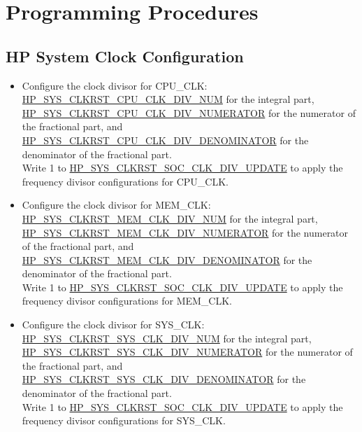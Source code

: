 \documentclass[main\_\_EN.tex]{subfiles}
\begin{document}
\section{Programming Procedures}
\label{sec:resclk-prog-procedures}

\subsection{HP System Clock Configuration}

\begin{itemize}
    \item Configure the clock divisor for CPU\_CLK: \hyperref[fielddesc:HPSYSCLKRSTCPUCLKDIVNUM]{HP\_SYS\_CLKRST\_CPU\_CLK\_DIV\_NUM} for the integral part, \hyperref[fielddesc:HPSYSCLKRSTCPUCLKDIVNUMERATOR]{HP\_SYS\_CLKRST\_CPU\_CLK\_DIV\_NUMERATOR} for the numerator of the fractional part, and \hyperref[fielddesc:HPSYSCLKRSTCPUCLKDIVDENOMINATOR]{HP\_SYS\_CLKRST\_CPU\_CLK\_DIV\_DENOMINATOR} for the denominator of the fractional part.\\
    Write 1 to \hyperref[fielddesc:HPSYSCLKRSTSOCCLKDIVUPDATE]{HP\_SYS\_CLKRST\_SOC\_CLK\_DIV\_UPDATE} to apply the frequency divisor configurations for CPU\_CLK.
    \item Configure the clock divisor for MEM\_CLK: \hyperref[fielddesc:HPSYSCLKRSTMEMCLKDIVNUM]{HP\_SYS\_CLKRST\_MEM\_CLK\_DIV\_NUM} for the integral part, \hyperref[fielddesc:HPSYSCLKRSTMEMCLKDIVNUMERATOR]{HP\_SYS\_CLKRST\_MEM\_CLK\_DIV\_NUMERATOR} for the numerator of the fractional part, and \hyperref[fielddesc:HPSYSCLKRSTMEMCLKDIVDENOMINATOR]{HP\_SYS\_CLKRST\_MEM\_CLK\_DIV\_DENOMINATOR} for the denominator of the fractional part.\\
    Write 1 to \hyperref[fielddesc:HPSYSCLKRSTSOCCLKDIVUPDATE]{HP\_SYS\_CLKRST\_SOC\_CLK\_DIV\_UPDATE} to apply the frequency divisor configurations for MEM\_CLK.
    \item Configure the clock divisor for SYS\_CLK: \hyperref[fielddesc:HPSYSCLKRSTSYSCLKDIVNUM]{HP\_SYS\_CLKRST\_SYS\_CLK\_DIV\_NUM} for the integral part, \hyperref[fielddesc:HPSYSCLKRSTSYSCLKDIVNUMERATOR]{HP\_SYS\_CLKRST\_SYS\_CLK\_DIV\_NUMERATOR} for the numerator of the fractional part, and \hyperref[fielddesc:HPSYSCLKRSTSYSCLKDIVDENOMINATOR]{HP\_SYS\_CLKRST\_SYS\_CLK\_DIV\_DENOMINATOR} for the denominator of the fractional part.\\
    Write 1 to \hyperref[fielddesc:HPSYSCLKRSTSOCCLKDIVUPDATE]{HP\_SYS\_CLKRST\_SOC\_CLK\_DIV\_UPDATE} to apply the frequency divisor configurations for SYS\_CLK.

\end{itemize}
\end{document}
